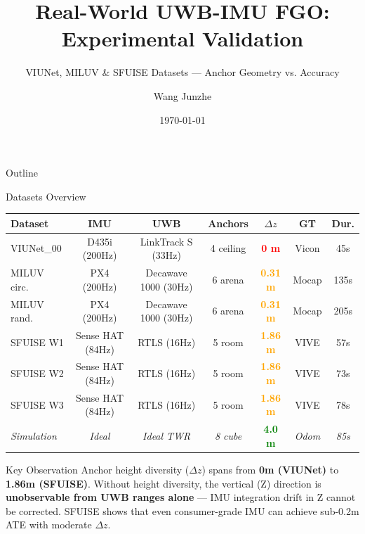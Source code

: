 \documentclass[10pt,aspectratio=169]{beamer}
\title{Real-World UWB-IMU FGO: Experimental Validation}
\subtitle{VIUNet, MILUV \& SFUISE Datasets — Anchor Geometry vs. Accuracy}
\author{Wang Junzhe}
\date{\today}
\begin{document}
\begin{frame}{Outline}
\tableofcontents
\end{frame}

\begin{frame}{Datasets Overview}
\centering
\begin{table}
\footnotesize
\begin{tabular}{lcccccc}
\toprule
\textbf{Dataset} & \textbf{IMU} & \textbf{UWB} & \textbf{Anchors} &
\textbf{$\Delta z$} & \textbf{GT} & \textbf{Dur.} \\
\midrule
VIUNet\_00 & D435i (200Hz) & LinkTrack S (33Hz) & 4 ceiling & \textcolor{red}{\textbf{0 m}} & Vicon & 45s \\
MILUV circ. & PX4 (200Hz) & Decawave 1000 (30Hz) & 6 arena & \textcolor{orange}{\textbf{0.31 m}} & Mocap & 135s \\
MILUV rand. & PX4 (200Hz) & Decawave 1000 (30Hz) & 6 arena & \textcolor{orange}{\textbf{0.31 m}} & Mocap & 205s \\
SFUISE W1 & Sense HAT (84Hz) & RTLS (16Hz) & 5 room & \textcolor{orange}{\textbf{1.86 m}} & VIVE & 57s \\
SFUISE W2 & Sense HAT (84Hz) & RTLS (16Hz) & 5 room & \textcolor{orange}{\textbf{1.86 m}} & VIVE & 73s \\
SFUISE W3 & Sense HAT (84Hz) & RTLS (16Hz) & 5 room & \textcolor{orange}{\textbf{1.86 m}} & VIVE & 78s \\
\midrule
\textit{Simulation} & \textit{Ideal} & \textit{Ideal TWR} & \textit{8 cube} & \textcolor{green}{\textbf{4.0 m}} & \textit{Odom} & \textit{85s} \\
\bottomrule
\end{tabular}
\end{table}

\vspace{0.3cm}
\begin{block}{Key Observation}
Anchor height diversity ($\Delta z$) spans from \textbf{0m (VIUNet)} to \textbf{1.86m (SFUISE)}.
Without height diversity, the vertical (Z) direction is \textbf{unobservable from UWB ranges
alone} — IMU integration drift in Z cannot be corrected. SFUISE shows that even
consumer-grade IMU can achieve sub-0.2m ATE with moderate $\Delta z$.
\end{block}
\end{frame}
\end{document}

